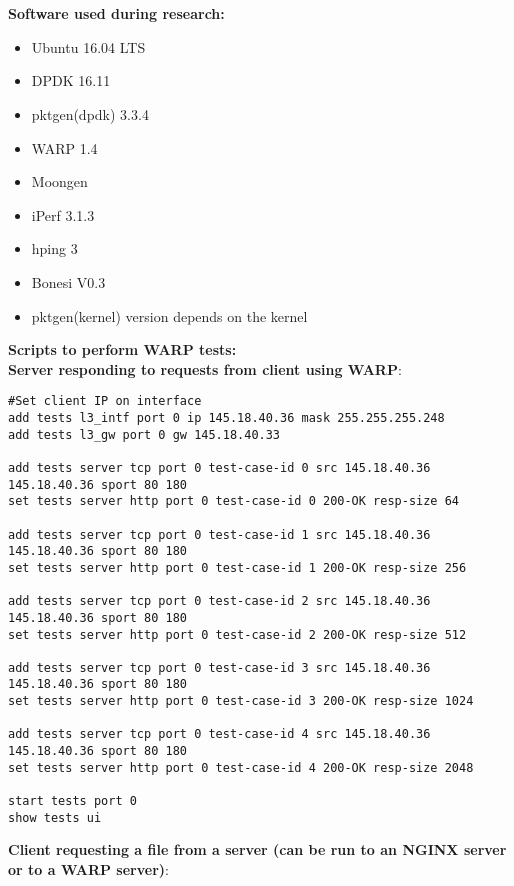 \thispagestyle{empty}

\chapter{}\label{appendix:software}

\textbf{Software used during research:}
\begin{itemize}
\item{Ubuntu 16.04 LTS}
\item{DPDK 16.11}
\item{pktgen(dpdk) 3.3.4}
\item{WARP 1.4}
\item{Moongen}
\item{iPerf 3.1.3}
\item{hping 3}
\item{Bonesi V0.3}
\item{pktgen(kernel) version depends on the kernel}
\end{itemize}
\textbf{Scripts to perform WARP tests:\\}
\textbf{Server responding to requests from client using WARP}:
\begin{verbatim}
#Set client IP on interface
add tests l3_intf port 0 ip 145.18.40.36 mask 255.255.255.248
add tests l3_gw port 0 gw 145.18.40.33 

add tests server tcp port 0 test-case-id 0 src 145.18.40.36 145.18.40.36 sport 80 180
set tests server http port 0 test-case-id 0 200-OK resp-size 64

add tests server tcp port 0 test-case-id 1 src 145.18.40.36 145.18.40.36 sport 80 180
set tests server http port 0 test-case-id 1 200-OK resp-size 256

add tests server tcp port 0 test-case-id 2 src 145.18.40.36 145.18.40.36 sport 80 180
set tests server http port 0 test-case-id 2 200-OK resp-size 512

add tests server tcp port 0 test-case-id 3 src 145.18.40.36 145.18.40.36 sport 80 180
set tests server http port 0 test-case-id 3 200-OK resp-size 1024

add tests server tcp port 0 test-case-id 4 src 145.18.40.36 145.18.40.36 sport 80 180
set tests server http port 0 test-case-id 4 200-OK resp-size 2048

start tests port 0
show tests ui
\end{verbatim}
\textbf{Client requesting a file from a server (can be run to an NGINX server or to a WARP server)}:
